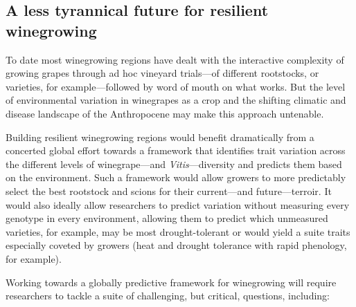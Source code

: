 \documentclass[11pt]{article}
\begin{document}

\subsection{A less tyrannical future for resilient winegrowing}

To date most winegrowing regions have dealt with the interactive complexity of growing grapes through ad hoc vineyard trials---of different rootstocks, or varieties, for example---followed by word of mouth on what works. But the level of environmental variation in winegrapes as a crop and the shifting climatic and disease landscape of the Anthropocene may make this approach untenable. 

Building resilient winegrowing regions would benefit dramatically from a concerted global effort towards a framework that identifies trait variation across the different levels of winegrape---and \emph{Vitis}---diversity and predicts them based on the environment. Such a framework would allow growers to more predictably select the best rootstock and scions for their current---and future---terroir. It would also ideally allow researchers to predict variation without measuring every genotype in every environment, allowing them to predict which unmeasured varieties, for example, may be most drought-tolerant or would yield a suite traits especially coveted by growers (heat and drought tolerance with rapid phenology, for example). 

Working towards a globally predictive framework for winegrowing will require researchers to tackle a suite of challenging, but critical, questions, including:
\end{document}
